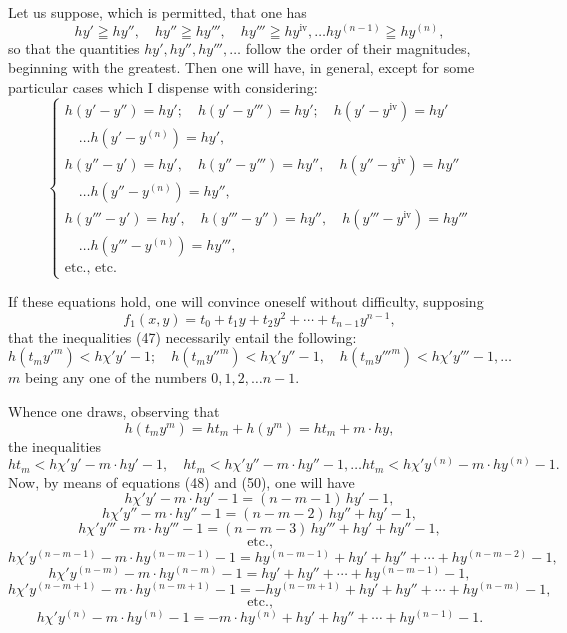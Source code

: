 \documentclass{article}
\begin{document}
Let us suppose, which is permitted, that one has
\[ hy' \geqq hy'', \quad hy'' \geqq hy''', \quad hy''' \geqq hy^{\text{iv}}, \ldots hy^{(n-1)} \geqq hy^{(n)}, \tag{49} \]
so that the quantities $hy', hy'', hy''', \ldots$ follow the order of their magnitudes, beginning with the greatest. Then one will have, in general, except for some particular cases which I dispense with considering:
\[ \begin{cases}
h(y'-y'') = hy'; \quad h(y'-y''') = hy'; \quad h(y'-y^{\text{iv}}) = hy' \\
\quad \ldots h(y'-y^{(n)}) = hy', \\
h(y''-y') = hy', \quad h(y''-y''') = hy'', \quad h(y''-y^{\text{iv}}) = hy'' \\
\quad \ldots h(y''-y^{(n)}) = hy'', \\
h(y'''-y') = hy', \quad h(y'''-y'') = hy'', \quad h(y'''-y^{\text{iv}}) = hy''' \\
\quad \ldots h(y'''-y^{(n)}) = hy''', \\
\text{etc., etc.}
\end{cases} \tag{50} \]

If these equations hold, one will convince oneself without difficulty, supposing
\[ f_1(x, y) = t_0 + t_1 y + t_2 y^{2} + \cdots + t_{n-1} y^{n-1}, \tag{51} \]
that the inequalities (47) necessarily entail the following:
\[ h(t_m y'^{m}) < h\chi' y' - 1; \quad h(t_m y''^{m}) < h\chi' y'' - 1, \quad h(t_m y'''^{m}) < h\chi' y''' - 1, \ldots \tag{52} \]
$m$ being any one of the numbers $0, 1, 2, \ldots n-1$.

Whence one draws, observing that
\[ h(t_m y^{m}) = ht_m + h(y^{m}) = ht_m + m \cdot hy, \]
the inequalities
\[ ht_m < h\chi' y' - m \cdot hy' - 1, \quad ht_m < h\chi' y'' - m \cdot hy'' - 1, \ldots ht_m < h\chi' y^{(n)} - m \cdot hy^{(n)} - 1. \]
Now, by means of equations (48) and (50), one will have
\[ h\chi' y' - m \cdot hy' - 1 = (n-m-1)\,hy' - 1, \]
\[ h\chi' y'' - m \cdot hy'' - 1 = (n-m-2)\,hy'' + hy' - 1, \]
\[ h\chi' y''' - m \cdot hy''' - 1 = (n-m-3)\,hy''' + hy' + hy'' - 1, \]
\[ \text{etc.,} \]
\[ h\chi' y^{(n-m-1)} - m \cdot hy^{(n-m-1)} - 1 = hy^{(n-m-1)} + hy' + hy'' + \cdots + hy^{(n-m-2)} - 1, \]
\[ h\chi' y^{(n-m)} - m \cdot hy^{(n-m)} - 1 = hy' + hy'' + \cdots + hy^{(n-m-1)} - 1, \]
\[ h\chi' y^{(n-m+1)} - m \cdot hy^{(n-m+1)} - 1 = -hy^{(n-m+1)} + hy' + hy'' + \cdots + hy^{(n-m)} - 1, \]
\[ \text{etc.,} \]
\[ h\chi' y^{(n)} - m \cdot hy^{(n)} - 1 = -m \cdot hy^{(n)} + hy' + hy'' + \cdots + hy^{(n-1)} - 1. \]
\end{document}
